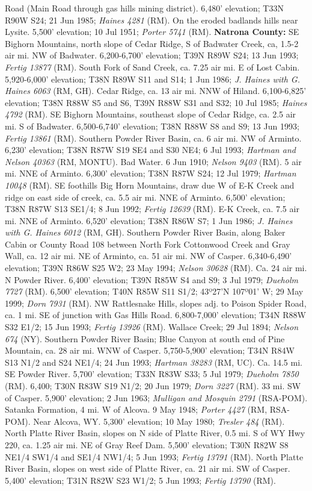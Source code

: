 Road (Main Road through gas hills mining district). 6,480' elevation; T33N R90W S24; 21 Jun 1985; \textit{Haines 4281} (RM).  On the eroded badlands hills near Lysite. 5,500' elevation; 10 Jul 1951; \textit{Porter 5741} (RM).  \textbf{Natrona County:} SE Bighorn Mountains, north slope of Cedar Ridge, S of Badwater Creek, ca, 1.5-2 air mi. NW of Badwater. 6,200-6,700’ elevation; T39N R89W S24; 13 Jun 1993; \textit{Fertig 13877} (RM).  South Fork of Sand Creek, ca. 7.25 air mi. E of Lost Cabin. 5,920-6,000’ elevation; T38N R89W S11 and S14; 1 Jun 1986; \textit{J. Haines with G. Haines 6063} (RM, GH).  Cedar Ridge, ca. 13 air mi. NNW of Hiland. 6,100-6,825’ elevation; T38N R88W S5 and S6, T39N R88W S31 and S32; 10 Jul 1985; \textit{Haines 4792} (RM). SE Bighorn Mountains, southeast slope of Cedar Ridge, ca. 2.5 air mi. S of Badwater. 6,500-6,740’ elevation; T38N R88W S8 and S9; 13 Jun 1993; \textit{Fertig 13861} (RM).  Southern Powder River Basin, ca. 6 air mi. NW of Arminto. 6,230’ elevation; T38N R87W S19 SE4 and S30 NE4; 6 Jul 1993; \textit{Hartman and Nelson 40363} (RM, MONTU).  Bad Water. 6 Jun 1910; \textit{Nelson 9403} (RM).  5 air mi. NNE of Arminto. 6,300’ elevation; T38N R87W S24; 12 Jul 1979; \textit{Hartman 10048} (RM).  SE foothills Big Horn Mountains, draw due W of E-K Creek and ridge on east side of creek, ca. 5.5 air mi. NNE of Arminto. 6,500’ elevation; T38N R87W S13 SE1/4; 8 Jun 1992; \textit{Fertig 12639} (RM).  E-K Creek, ca. 7.5 air mi. NNE of Arminto. 6,520’ elevation; T38N R86W S7; 1 Jun 1986; \textit{J. Haines with G. Haines 6012} (RM, GH).  Southern Powder River Basin, along Baker Cabin or County Road 108 between North Fork Cottonwood Creek and Gray Wall, ca. 12 air mi. NE of Arminto, ca. 51 air mi. NW of Casper. 6,340-6,490’ elevation; T39N R86W S25 W2; 23 May 1994; \textit{Nelson 30628} (RM).  Ca. 24 air mi. N Powder River. 6,400’ elevation; T39N R85W S4 and S9; 3 Jul 1979; \textit{Dueholm 7727} (RM).  6,500' elevation; T40N R85W S11 S1/2;	43º27'N 107º01' W; 29 May 1999; \textit{Dorn 7931} (RM).  NW Rattlesnake Hills, slopes adj. to Poison Spider Road, ca. 1 mi. SE of junction with Gas Hills Road. 6,800-7,000’ elevation; T34N R88W S32 E1/2; 15 Jun 1993; \textit{Fertig 13926} (RM).  Wallace Creek; 29 Jul 1894; \textit{Nelson 674} (NY).  Southern Powder River Basin; Blue Canyon at south end of Pine Mountain, ca. 28 air mi. WNW of Casper.	5,750-5,900' elevation; T34N R84W S13	N1/2 and S24 NE1/4; 24 Jun 1993; \textit{Hartman 38283} (RM, UC).  Ca. 14.5 mi. SE Powder River. 5,700’ elevation; T33N R83W S33; 5 Jul 1979; \textit{Dueholm 7850} (RM). 6,400; T30N R83W S19 N1/2; 20 Jun 1979; \textit{Dorn 3227} (RM).  33 mi. SW of Casper. 5,900’ elevation; 2 Jun 1963; \textit{Mulligan and Mosquin 2791} (RSA-POM).  Satanka Formation, 4 mi. W of Alcova. 9 May 1948; \textit{Porter 4427} (RM, RSA-POM).  Near Alcova, WY.  5,300’ elevation; 10 May 1980; \textit{Tresler 484} (RM).  North Platte River Basin, slopes on N side of Platte River, 0.5 mi. S of WY Hwy 220, ca. 1.25 air mi. NE of Gray Reef Dam. 5,500’ elevation; T30N R82W S8 NE1/4 SW1/4 and SE1/4 NW1/4; 5 Jun 1993; \textit{Fertig 13791} (RM).  North Platte River Basin, slopes on west side of Platte River, ca. 21 air mi. SW of Casper. 5,400’ elevation; T31N R82W S23 W1/2; 5 Jun 1993; \textit{Fertig 13790} (RM).  